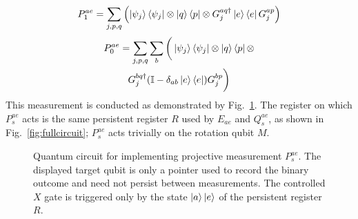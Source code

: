 \documentclass[aps,floatfix,10pt,amssymb,amsfont,amsmath,superscriptaddress,float,nofootinbib,longbibliography,nobalancelastpage,twocolumn]{revtex4-2}
\begin{document}
\begin{equation}
    P^{ae}_1 = \sum_{j,p,q} \left( \ket{\psi_j}\bra{\psi_j} \otimes \ket{q}\bra{p} \otimes G_j^{aq\dagger}\ket{e}\bra{e}G_j^{ap} \right)
\end{equation}
\begin{multline}
    P^{ae}_0 = \sum_{j,p,q} \sum_{b}\bigg( \ket{\psi_j}\bra{\psi_j} \otimes \ket{q}\bra{p} \otimes \\G_j^{bq\dagger}(\mathbb{I} - \delta_{ab}\ket{e}\bra{e})G_j^{bp}  \bigg)
\end{multline}
This measurement is conducted as demonstrated by Fig.~\ref{fig:Pcircuit}. The register on which $P_s^{ae}$ acts is the same persistent register $R$ used by $E_{ae}$ and $Q_s^{ae}$, as shown in Fig.~\ref{fig:fullcircuit}; $P_s^{ae}$ acts trivially on the rotation qubit $M$.
\begin{figure}

\caption{Quantum circuit for implementing projective measurement $P_s^{ae}$. The displayed target qubit is only a pointer used to record the binary outcome and need not persist between measurements. The controlled $X$ gate is triggered only by the state $\ket{a}\ket{e}$ of the persistent register $R$.}
\label{fig:Pcircuit}
\end{figure}
\end{document}

